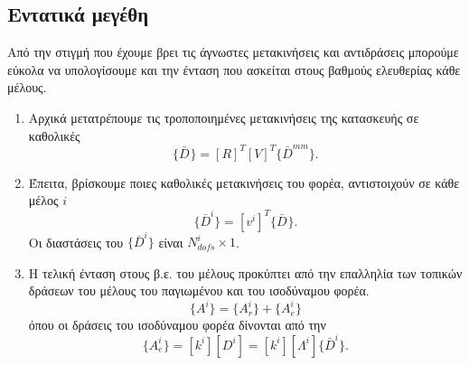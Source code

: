 \documentclass[a4paper, twocolumn]{article}
\newcommand{\num}[1]{ N_{\mathit{#1}} }
\newcommand{\vect}[1]{ \{ #1\} }
\newcommand{\mat}[1]{\left[ #1 \right]}
\newcommand{\lstiff}[1]{\mat{k^{\mathit{#1}}}}
\newcommand{\gdisp}[1]{\vect{\bar{D}^{\mathit{#1}}}}
\begin{document}
\subsection{Εντατικά μεγέθη}
Από την στιγμή που έχουμε βρει τις άγνωστες μετακινήσεις και 
αντιδράσεις μπορούμε εύκολα να υπολογίσουμε και την ένταση που 
ασκείται στους βαθμούς ελευθερίας κάθε μέλους.

\begin{enumerate}
	\item Αρχικά μετατρέπουμε τις τροποποιημένες μετακινήσεις της 
	κατασκευής σε καθολικές
	\begin{equation}
		\gdisp{} =\mat{R}^T \mat{V}^T \gdisp{mm}.
	\end{equation}
		
	\item Έπειτα, βρίσκουμε ποιες καθολικές μετακινήσεις του φορέα, 
	αντιστοιχούν σε κάθε μέλος $i$
	\begin{equation}
		\gdisp{i} = \mat{v^i}^T \gdisp{}.
	\end{equation}
	Οι διαστάσεις του $\gdisp{i}$ είναι $\num{dofs}^i \times 1$.
	
	\item Η τελική ένταση στους β.ε. του μέλους προκύπτει από την 
	επαλληλία των τοπικών δράσεων του μέλους του παγιωμένου και του 
	ισοδύναμου φορέα.
	\begin{equation}
		\vect{A^i} = \vect{A^i_r} + \vect{A^i_e}
	\end{equation}
	όπου οι δράσεις του ισοδύναμου φορέα δίνονται από την
	\begin{equation}
		\vect{A^i_e} = \lstiff{i} \mat{D^i}
		= \lstiff{i} \mat{\Lambda^i} \gdisp{i}.
	\end{equation}
\end{enumerate}
\end{document}
